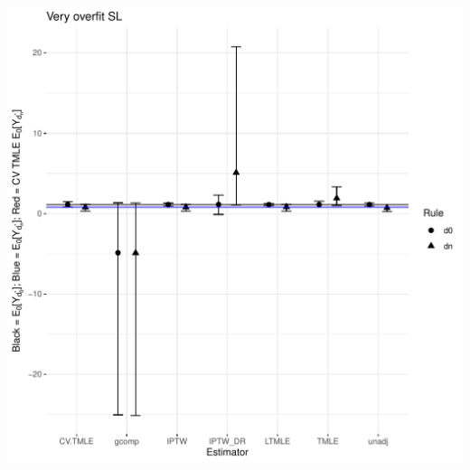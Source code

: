 \documentclass[11pt]{article}\usepackage[]{graphicx}\usepackage[]{color}
\makeatletter
\def\maxwidth{ %
  \ifdim\Gin@nat@width>\linewidth
    \linewidth
  \else
    \Gin@nat@width
  \fi
}
\newenvironment{knitrout}{}{} %
\makeatother
\begin{document}
\begin{knitrout}
\includegraphics[width=\maxwidth]{figure/unnamed-chunk-1-5} 

\end{knitrout}
\end{document}
